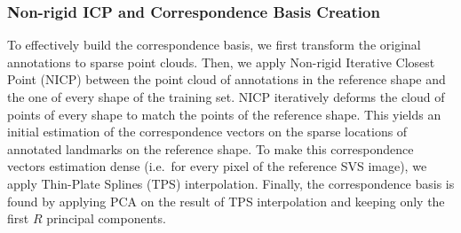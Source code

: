 %



\subsubsection{Non-rigid ICP and Correspondence Basis Creation} \label{sec:trabasis}



To effectively build the correspondence basis, we first transform the original annotations to sparse point clouds. Then, we apply Non-rigid Iterative Closest Point (NICP)\cite{Amber2007} between the point cloud of annotations in the reference shape and the one of every shape of the training set. NICP iteratively deforms the cloud of points of every shape to match the points of the reference shape. This yields an initial estimation of the correspondence vectors on the sparse locations of annotated landmarks on the reference shape. To make this correspondence vectors estimation dense (i.e.~for every pixel of the reference SVS image), we apply Thin-Plate Splines (TPS)\cite{Bookstein1989} interpolation. Finally, the correspondence basis is found by applying PCA on the result of TPS interpolation and keeping only the first $R$ principal components.





